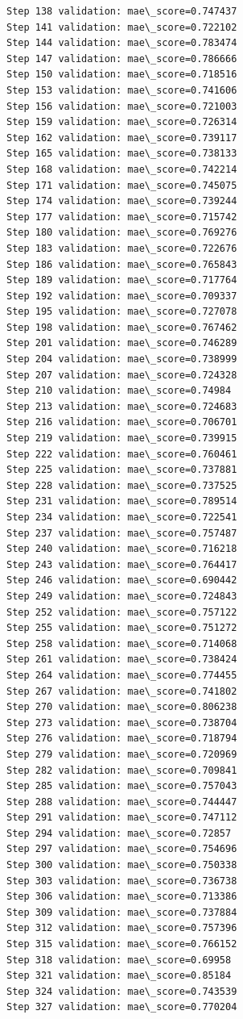 \documentclass[11pt]{article}
\begin{document}
\begin{Verbatim}[commandchars=\\\{\}]
Step 138 validation: mae\_score=0.747437
Step 141 validation: mae\_score=0.722102
Step 144 validation: mae\_score=0.783474
Step 147 validation: mae\_score=0.786666
Step 150 validation: mae\_score=0.718516
Step 153 validation: mae\_score=0.741606
Step 156 validation: mae\_score=0.721003
Step 159 validation: mae\_score=0.726314
Step 162 validation: mae\_score=0.739117
Step 165 validation: mae\_score=0.738133
Step 168 validation: mae\_score=0.742214
Step 171 validation: mae\_score=0.745075
Step 174 validation: mae\_score=0.739244
Step 177 validation: mae\_score=0.715742
Step 180 validation: mae\_score=0.769276
Step 183 validation: mae\_score=0.722676
Step 186 validation: mae\_score=0.765843
Step 189 validation: mae\_score=0.717764
Step 192 validation: mae\_score=0.709337
Step 195 validation: mae\_score=0.727078
Step 198 validation: mae\_score=0.767462
Step 201 validation: mae\_score=0.746289
Step 204 validation: mae\_score=0.738999
Step 207 validation: mae\_score=0.724328
Step 210 validation: mae\_score=0.74984
Step 213 validation: mae\_score=0.724683
Step 216 validation: mae\_score=0.706701
Step 219 validation: mae\_score=0.739915
Step 222 validation: mae\_score=0.760461
Step 225 validation: mae\_score=0.737881
Step 228 validation: mae\_score=0.737525
Step 231 validation: mae\_score=0.789514
Step 234 validation: mae\_score=0.722541
Step 237 validation: mae\_score=0.757487
Step 240 validation: mae\_score=0.716218
Step 243 validation: mae\_score=0.764417
Step 246 validation: mae\_score=0.690442
Step 249 validation: mae\_score=0.724843
Step 252 validation: mae\_score=0.757122
Step 255 validation: mae\_score=0.751272
Step 258 validation: mae\_score=0.714068
Step 261 validation: mae\_score=0.738424
Step 264 validation: mae\_score=0.774455
Step 267 validation: mae\_score=0.741802
Step 270 validation: mae\_score=0.806238
Step 273 validation: mae\_score=0.738704
Step 276 validation: mae\_score=0.718794
Step 279 validation: mae\_score=0.720969
Step 282 validation: mae\_score=0.709841
Step 285 validation: mae\_score=0.757043
Step 288 validation: mae\_score=0.744447
Step 291 validation: mae\_score=0.747112
Step 294 validation: mae\_score=0.72857
Step 297 validation: mae\_score=0.754696
Step 300 validation: mae\_score=0.750338
Step 303 validation: mae\_score=0.736738
Step 306 validation: mae\_score=0.713386
Step 309 validation: mae\_score=0.737884
Step 312 validation: mae\_score=0.757396
Step 315 validation: mae\_score=0.766152
Step 318 validation: mae\_score=0.69958
Step 321 validation: mae\_score=0.85184
Step 324 validation: mae\_score=0.743539
Step 327 validation: mae\_score=0.770204

\end{Verbatim}
\end{document}
